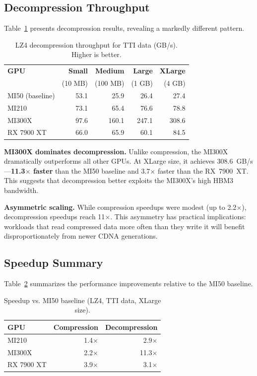\documentclass[runningheads]{llncs}
\begin{document}
\subsection{Decompression Throughput}

Table~\ref{tab:decomp_lz4} presents decompression results, revealing a markedly different pattern.

\begin{table}[t]
\centering
\caption{LZ4 decompression throughput for TTI data (GB/s). Higher is better.}
\label{tab:decomp_lz4}
\begin{tabular}{lrrrr}
\toprule
\textbf{GPU} & \textbf{Small} & \textbf{Medium} & \textbf{Large} & \textbf{XLarge} \\
 & (10 MB) & (100 MB) & (1 GB) & (4 GB) \\
\midrule
MI50 (baseline) & 53.1 & 25.9 & 26.4 & 27.4 \\
MI210 & 73.1 & 65.4 & 76.6 & 78.8 \\
MI300X & 97.6 & 160.1 & 247.1 & 308.6 \\
RX 7900 XT & 66.0 & 65.9 & 60.1 & 84.5 \\
\bottomrule
\end{tabular}
\end{table}

\textbf{MI300X dominates decompression.} Unlike compression, the MI300X dramatically outperforms all other GPUs. At XLarge size, it achieves 308.6~GB/s---\textbf{11.3$\times$ faster} than the MI50 baseline and 3.7$\times$ faster than the RX~7900~XT. This suggests that decompression better exploits the MI300X's high HBM3 bandwidth.

\textbf{Asymmetric scaling.} While compression speedups were modest (up to 2.2$\times$), decompression speedups reach 11$\times$. This asymmetry has practical implications: workloads that read compressed data more often than they write it will benefit disproportionately from newer CDNA generations.

\subsection{Speedup Summary}

Table~\ref{tab:speedup} summarizes the performance improvements relative to the MI50 baseline.

\begin{table}[t]
\centering
\caption{Speedup vs. MI50 baseline (LZ4, TTI data, XLarge size).}
\label{tab:speedup}
\begin{tabular}{lrr}
\toprule
\textbf{GPU} & \textbf{Compression} & \textbf{Decompression} \\
\midrule
MI210 & 1.4$\times$ & 2.9$\times$ \\
MI300X & 2.2$\times$ & 11.3$\times$ \\
RX 7900 XT & 3.9$\times$ & 3.1$\times$ \\
\bottomrule
\end{tabular}
\end{table}
\end{document}
